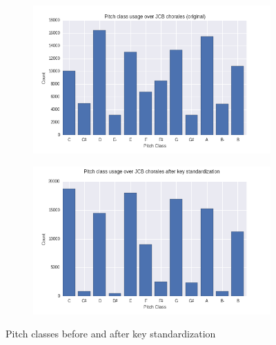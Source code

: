 \documentclass[dissertation.tex]{subfiles}
\begin{document}
\begin{figure}
    \centering
    \begin{subfigure}[b]{0.48\textwidth}
        \centering
        \includegraphics[width=1.0\linewidth]{Figures/pitch-class-usage-original.png}
    \end{subfigure}
    \begin{subfigure}[b]{0.48\textwidth}
        \centering
        \includegraphics[width=1.0\linewidth]{Figures/pitch-class-usage-preproc.png}
    \end{subfigure}
    \caption{Pitch classes before and after key standardization}
    \label{fig:pc-key-standardization}
\end{figure}
\end{document}

